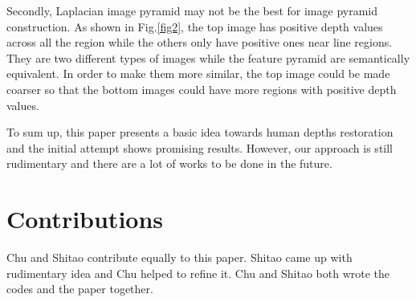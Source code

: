 \documentclass{article} %
\begin{document}
Secondly, Laplacian image pyramid may not be the best for image pyramid construction. As shown in Fig.\ref{fig2}, the top image has positive depth values across all the region while the others only have positive ones near line regions. They are two different types of images while the feature pyramid are semantically equivalent. In order to make them more similar, the top image could be made coarser so that the bottom images could have more regions with positive depth values.

To sum up, this paper presents a basic idea towards human depths restoration and the initial attempt shows promising results. However, our approach is still rudimentary and there are a lot of works to be done in the future.

\appendix
\section{Contributions}
Chu and Shitao contribute equally to this paper. Shitao came up with rudimentary idea and Chu helped to refine it. Chu and Shitao both wrote the codes and the paper together.


\end{document}
